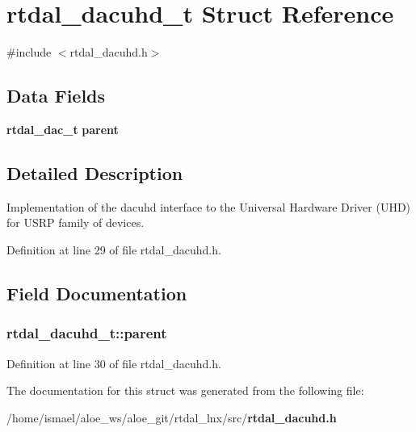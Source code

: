 \section{rtdal\-\_\-dacuhd\-\_\-t Struct Reference}
\label{structrtdal__dacuhd__t}


{\ttfamily \#include $<$rtdal\-\_\-dacuhd.\-h$>$}

\subsection*{Data Fields}
\begin{DoxyCompactItemize}
\item 
{\bf rtdal\-\_\-dac\-\_\-t} {\bf parent}
\end{DoxyCompactItemize}


\subsection{Detailed Description}
Implementation of the dacuhd interface to the Universal Hardware Driver (U\-H\-D) for U\-S\-R\-P family of devices. 

Definition at line 29 of file rtdal\-\_\-dacuhd.\-h.



\subsection{Field Documentation}
\subsubsection[{parent}]{ rtdal\-\_\-dacuhd\-\_\-t\-::parent}\label{structrtdal__dacuhd__t_aec26b87f7f7c6ef85c415a4b0aa23027}


Definition at line 30 of file rtdal\-\_\-dacuhd.\-h.



The documentation for this struct was generated from the following file\-:\begin{DoxyCompactItemize}
\item 
/home/ismael/aloe\-\_\-ws/aloe\-\_\-git/rtdal\-\_\-lnx/src/{\bf rtdal\-\_\-dacuhd.\-h}\end{DoxyCompactItemize}
